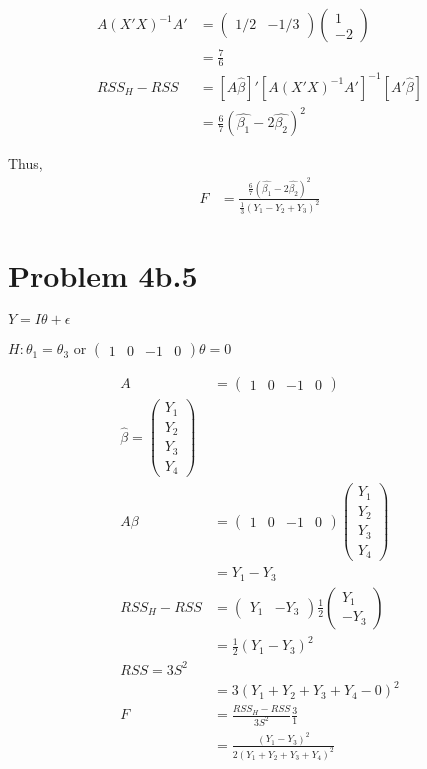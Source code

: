 \documentclass[a4paper]{article}
\begin{document}
\begin{align*}
A(X'X)^{-1}A' &= \begin{pmatrix}1/2 & -1/3 \end{pmatrix}\begin{pmatrix}
1 \\ -2
\end{pmatrix}\\
&= \frac{7}{6}\\
RSS_H-RSS &= [A\hat{\beta}]'[A(X'X)^{-1}A']^{-1}[A'\hat{\beta}]\\ 
&= \frac{6}{7}(\hat{\beta_1}-2\hat{\beta_2})^2
\end{align*}

Thus,
\begin{align*}
F &= \frac{\frac{6}{7}(\hat{\beta_1}-2\hat{\beta_2})^2}{\frac{1}{3}(Y_1-Y_2+Y_3)^2}
\end{align*}

\section*{Problem 4b.5}
$Y=I\theta+\epsilon$

$H: \theta_1 =\theta_3 $ or $\begin{pmatrix} 1 & 0 & -1 & 0 \end{pmatrix}\theta=0$

\begin{align*}
A &= \begin{pmatrix}
1 & 0 & -1 & 0
\end{pmatrix}\\
\hat{\beta} = \begin{pmatrix}
Y_1\\
Y_2\\
Y_3\\
Y_4
\end{pmatrix}\\
A\beta &= \begin{pmatrix} 1 & 0 & -1 & 0 \end{pmatrix} \begin{pmatrix}
Y_1\\Y_2\\Y_3\\Y_4
\end{pmatrix}\\
&= Y_1-Y_3\\
RSS_H-RSS &= \begin{pmatrix} Y_1 & -Y_3 \end{pmatrix}\frac{1}{2}\begin{pmatrix} Y_1 \\
-Y_3
\end{pmatrix}\\
&= \frac{1}{2}(Y_1-Y_3)^2\\
RSS = 3S^2\\
&= 3(Y_1+Y_2+Y_3+Y_4-0)^2\\
F &= \frac{RSS_H-RSS}{3S^2}\frac{3}{1}\\
&= \frac{(Y_1-Y_3)^2}{2(Y_1+Y_2+Y_3+Y_4)^2}
\end{align*}
\end{document}
